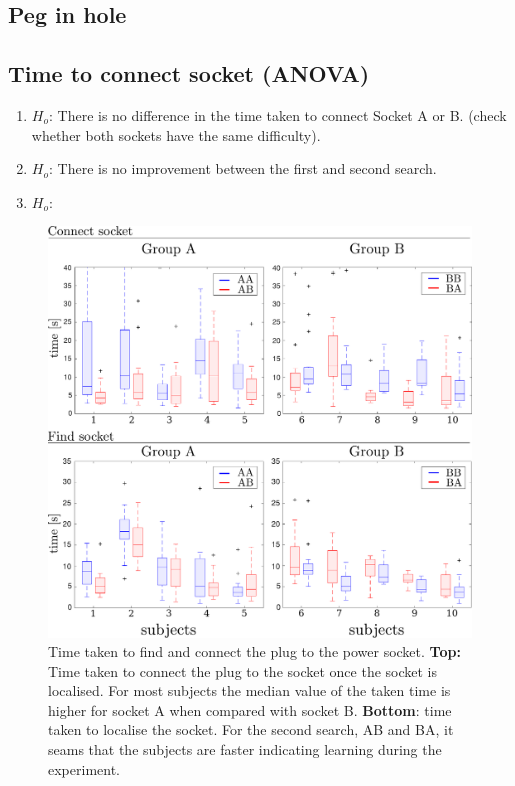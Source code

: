 
\begin{appendices}

\chapter{Peg in hole}

\section{Time to connect socket (ANOVA)}
\label{app:anova_socket}

\begin{enumerate}
 \item $H_o$: There is no difference in the time taken to connect Socket A or B. (check whether both 
 sockets have the same difficulty).
 \item $H_o$: There is no improvement between the first and second search.
 \item $H_o$:
\end{enumerate}

\begin{figure}
 \centering
 \includegraphics[width=\textwidth]{./ch4-PiH/Figures/time_taken_subgroup.pdf}
 \caption{Time taken to find and connect the plug to the power socket. \textbf{Top:} 
 Time taken to connect the plug to the socket once the socket is localised. For most subjects the median value of the taken time is higher 
 for socket A when compared with socket B. \textbf{Bottom}: time taken to localise the socket. For the second
 search, AB and BA, it seams that the subjects are faster indicating learning during the experiment.
 }
\end{figure}


\end{appendices}
